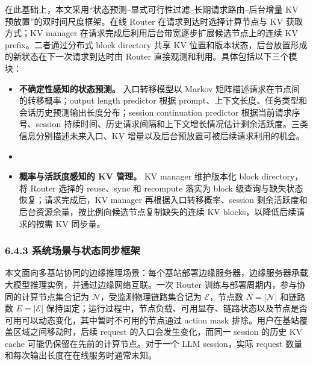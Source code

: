 在此基础上，本文采用“状态预测--显式可行性过滤--长期请求路由--后台增量 KV 预放置”的双时间尺度框架。在线 Router 在请求到达时选择计算节点与 KV 获取方式；KV manager 在请求完成后利用后台带宽逐步扩展候选节点上的连续 KV prefix。二者通过分布式 block directory 共享 KV 位置和版本状态，后台放置形成的新状态在下一次请求到达时由 Router 直接观测和利用。具体包括以下三个模块：
\begin{itemize}
    \item \textbf{不确定性感知的状态预测。} 入口转移模型以 Markov 矩阵描述请求在节点间的转移概率；output length predictor 根据 prompt、上下文长度、任务类型和会话历史预测输出长度分布；session continuation predictor 根据当前请求序号、session 持续时间、历史请求间隔和上下文增长情况估计剩余活跃度。三类信息分别描述未来入口、KV 增量以及后台预放置可被后续请求利用的机会。
    \item {}
    \item \textbf{概率与活跃度感知的 KV 管理。} KV manager 维护版本化 block directory，将 Router 选择的 reuse、sync 和 recompute 落实为 block 级查询与缺失状态恢复；请求完成后，KV manager 再根据入口转移概率、session 剩余活跃度和后台资源余量，按比例向候选节点复制缺失的连续 KV blocks，以降低后续请求的按需 KV 同步量。
\end{itemize}

\subsubsection*{6.4.3 系统场景与状态同步框架}

\begin{changehighlight}
本文面向多基站协同的边缘推理场景：每个基站部署边缘服务器，边缘服务器承载大模型推理实例，并通过边缘网络互联。一次 Router 训练与部署周期内，参与协同的计算节点集合记为 \(\mathcal N\)，受监测物理链路集合记为 \(\mathcal E\)，节点数 \(N=|\mathcal N|\) 和链路数 \(E=|\mathcal E|\) 保持固定；运行过程中，节点负载、可用显存、链路状态以及节点是否可用可以动态变化，其中暂时不可用的节点通过 action mask 排除。用户在基站覆盖区域之间移动时，后续 request 的入口会发生变化，而同一 session 的历史 KV cache 可能仍保留在先前的计算节点。对于一个 LLM session，实际 request 数量和每次输出长度在在线服务时通常未知。
\end{changehighlight}

